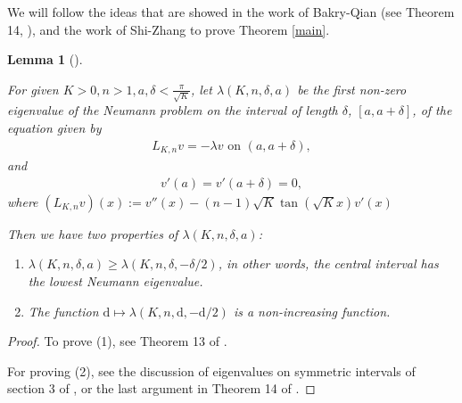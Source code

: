 \documentclass[11pt]{amsart}
\newtheorem{theorem}{Theorem}[section]
\newtheorem{lemma}[theorem]{Lemma}
\def\d{\mathrm{d}}
\begin{document}
We will follow the ideas that are showed in the work of Bakry-Qian (see Theorem 14, \cite{bakryqian}), and the work of Shi-Zhang \cite{shizhang} to prove Theorem \ref{main}.

\begin{lemma}[\cite{bakryqian}]\label{jjj}

For given $K>0,n>1,a,\delta<\frac{\pi}{\sqrt{K}}$, let $\lambda(K,n,\delta,a)$ be the first non-zero eigenvalue of the Neumann problem on the interval of length $\delta$, $[a,a+\delta]$, of the equation given by
\begin{align*}
   L_{K,n}v=-\lambda v\text{ on }(a,a+\delta),
\end{align*} and\begin{align*}
v'(a)=v'(a+\delta)=0,
\end{align*} where $(L_{K,n}v)(x):= v''(x)-(n-1)\sqrt{K}\tan(\sqrt{K}x)v'(x)$

Then we have two properties of $\lambda(K,n,\delta,a)$:
\begin{enumerate}[(1)]
    \item $\lambda(K,n,\delta,a)\geq \lambda(K,n,\delta,-\delta/2)$, in other words, the central interval has the lowest Neumann eigenvalue.
    \item The function $\d\mapsto \lambda(K,n,\d,-\d/2)$ is a non-increasing function.
\end{enumerate}




\end{lemma}

\begin{proof}
    To prove (1), see Theorem 13 of \cite{bakryqian}.

    For proving (2), see the discussion of eigenvalues on symmetric intervals of section 3 of \cite{bakryqian}, or the last argument in Theorem 14 of \cite{bakryqian}.
\end{proof}

\end{document}
